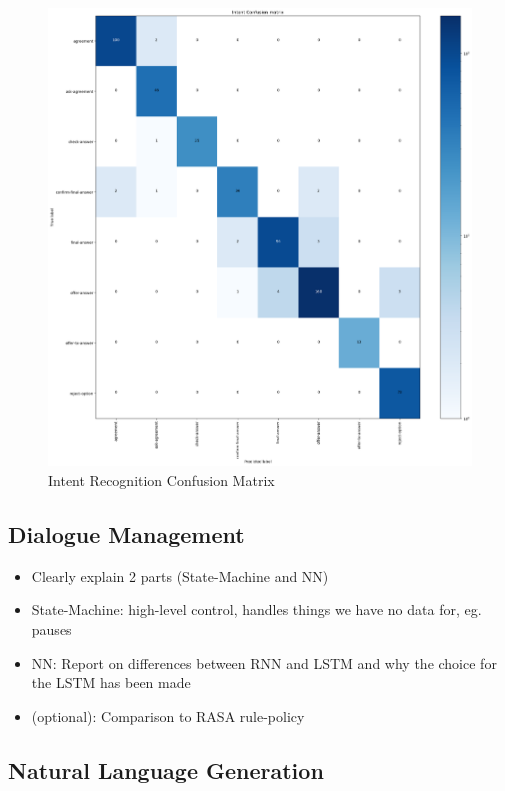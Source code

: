 \documentclass[hidelinks, 11pt]{article}
\begin{document}
\begin{figure}
  \includegraphics[width=\columnwidth]{../Rasa/Evaluation/Clean_Model/intent_confusion_matrix.png}
  \caption{Intent Recognition Confusion Matrix}
  \label{fig:intent_confusion_matrix}
\end{figure}

\subsection{Dialogue Management}
\label{subsec:dialogue_management}

\begin{itemize}
  \item Clearly explain 2 parts (State-Machine and NN)
  \item State-Machine: high-level control, handles things we have no data for, eg. pauses
  \item NN: Report on differences between RNN and LSTM and why the choice for the LSTM has been made
  \item (optional): Comparison to RASA rule-policy
\end{itemize}

\subsection{Natural Language Generation}
\label{subsec:nlg}
\end{document}

